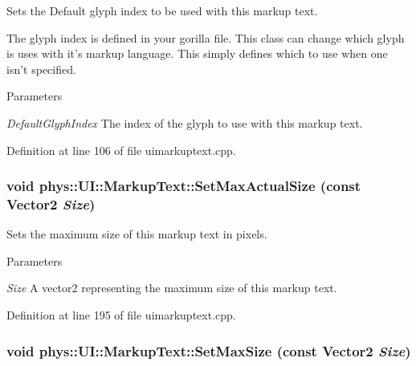 Sets the Default glyph index to be used with this markup text. 

The glyph index is defined in your gorilla file. This class can change which glyph is uses with it's markup language. This simply defines which to use when one isn't specified. 
\begin{DoxyParams}{Parameters}
\item[{\em DefaultGlyphIndex}]The index of the glyph to use with this markup text. \end{DoxyParams}


Definition at line 106 of file uimarkuptext.cpp.

\hypertarget{classphys_1_1UI_1_1MarkupText_a03b0e586c48e885b9c57968413603fa9}{
\subsubsection[{SetMaxActualSize}]{\setlength{\rightskip}{0pt plus 5cm}void phys::UI::MarkupText::SetMaxActualSize (const {\bf Vector2} {\em Size})}}
\label{d7/d23/classphys_1_1UI_1_1MarkupText_a03b0e586c48e885b9c57968413603fa9}


Sets the maximum size of this markup text in pixels. 


\begin{DoxyParams}{Parameters}
\item[{\em Size}]A vector2 representing the maximum size of this markup text. \end{DoxyParams}


Definition at line 195 of file uimarkuptext.cpp.

\hypertarget{classphys_1_1UI_1_1MarkupText_af8dd68edd25e9553fe559ad46852cd71}{
\subsubsection[{SetMaxSize}]{\setlength{\rightskip}{0pt plus 5cm}void phys::UI::MarkupText::SetMaxSize (const {\bf Vector2} {\em Size})}}
\label{d7/d23/classphys_1_1UI_1_1MarkupText_af8dd68edd25e9553fe559ad46852cd71}


